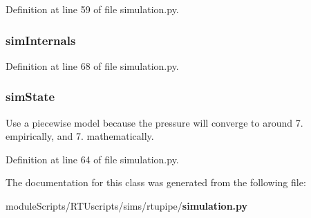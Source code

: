 Definition at line 59 of file simulation.\+py.

\subsubsection[{sim\+Internals}]{\setlength{\rightskip}{0pt plus 5cm}sim\+Internals}\label{classsims_1_1rtupipe_1_1simulation_1_1_simulation_ad9a1d9ec91b2b1f3b2890030194810db}


Definition at line 68 of file simulation.\+py.

\subsubsection[{sim\+State}]{\setlength{\rightskip}{0pt plus 5cm}sim\+State}\label{classsims_1_1rtupipe_1_1simulation_1_1_simulation_a41f89dc1173ec57bbed0975711b48c36}


Use a piecewise model because the pressure will converge to around 7. empirically, and 7. mathematically. 



Definition at line 64 of file simulation.\+py.



The documentation for this class was generated from the following file\+:\begin{DoxyCompactItemize}
\item 
module\+Scripts/\+R\+T\+Uscripts/sims/rtupipe/{\bf simulation.\+py}\end{DoxyCompactItemize}
